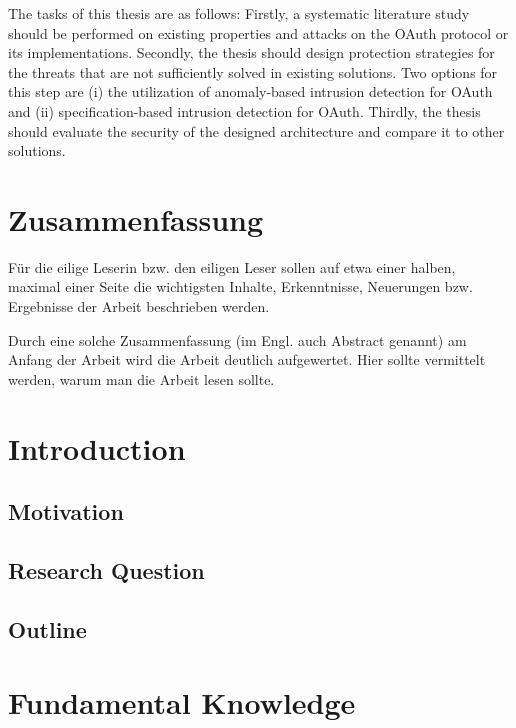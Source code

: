 \documentclass[
    fontsize=12pt,
    headings=small,
    parskip=half,           %
    bibliography=totoc,
    numbers=noenddot,       %
    open=any,               %
    ]{scrreprt}
\begin{document}
The tasks of this thesis are as follows: Firstly, a systematic literature study should be performed on existing properties and attacks on the OAuth protocol or its implementations. Secondly, the thesis should design protection strategies for the threats that are not sufficiently solved in existing solutions. Two options for this step are (i) the utilization of anomaly-based intrusion detection for OAuth and (ii) specification-based intrusion detection for OAuth. Thirdly, the thesis should evaluate the security of the designed architecture and compare it to other solutions.

\chapter*{Zusammenfassung}

Für die eilige Leserin bzw. den eiligen Leser sollen auf etwa einer halben, maximal einer Seite die wichtigsten Inhalte, Erkenntnisse, Neuerungen bzw. Ergebnisse der Arbeit beschrieben werden.

Durch eine solche Zusammenfassung (im Engl. auch Abstract genannt) am Anfang der Arbeit wird die Arbeit deutlich aufgewertet. Hier sollte vermittelt werden, warum man die Arbeit lesen sollte.

\tableofcontents

\chapter{Introduction}
\label{chap.introduction}
\section{Motivation}
\section{Research Question}
\section{Outline}

\chapter{Fundamental Knowledge}
\label{chap.fundamental_knowledge}
\end{document}
